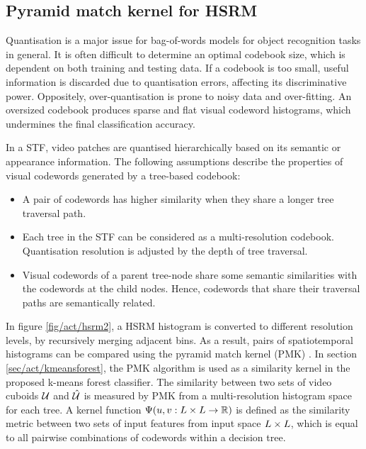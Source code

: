 \subsection{Pyramid match kernel for HSRM}
\label{sec/act/hsrmmatch}
Quantisation is a major issue for bag-of-words models for object recognition tasks in general. It is often difficult to determine an optimal codebook size, which is dependent on both training and testing data. 
If a codebook is too small, useful information is discarded due to quantisation errors, affecting its discriminative power. 
Oppositely, over-quantisation is prone to noisy data and over-fitting. An oversized codebook produces sparse and flat visual codeword histograms, which undermines the final classification accuracy.  

In a STF, video patches are quantised hierarchically based on its semantic or appearance information. The following assumptions describe the properties of visual codewords generated by a tree-based codebook:
\begin{itemize}
	\item A pair of codewords has higher similarity when they share a longer tree traversal path. 
	\item Each tree in the STF can be considered as a multi-resolution codebook. Quantisation resolution is adjusted by the depth of tree traversal.
	\item Visual codewords of a parent tree-node share some semantic similarities with the codewords at the child nodes. Hence, codewords that share their traversal paths are semantically related. 
\end{itemize} 

In figure \ref{fig/act/hsrm2}, a HSRM histogram is converted to different resolution levels, by recursively merging adjacent bins. As a result, pairs of spatiotemporal histograms can be compared using the pyramid match kernel (PMK) \cite{Grauman2005}. In section \ref{sec/act/kmeansforest}, the PMK algorithm is used as a similarity kernel in the proposed k-means forest classifier.
The similarity between two sets of video cuboids $\mathcal{U}$ and $\mathcal{\hat{U}}$ is measured by PMK from a multi-resolution histogram space for each tree. 
A kernel function $\Psi(u,v: L \times L \rightarrow \mathbb{R})$ is defined as the similarity metric between two sets of input features from input space $L \times L$, which is equal to all pairwise combinations of codewords within a decision tree.  

